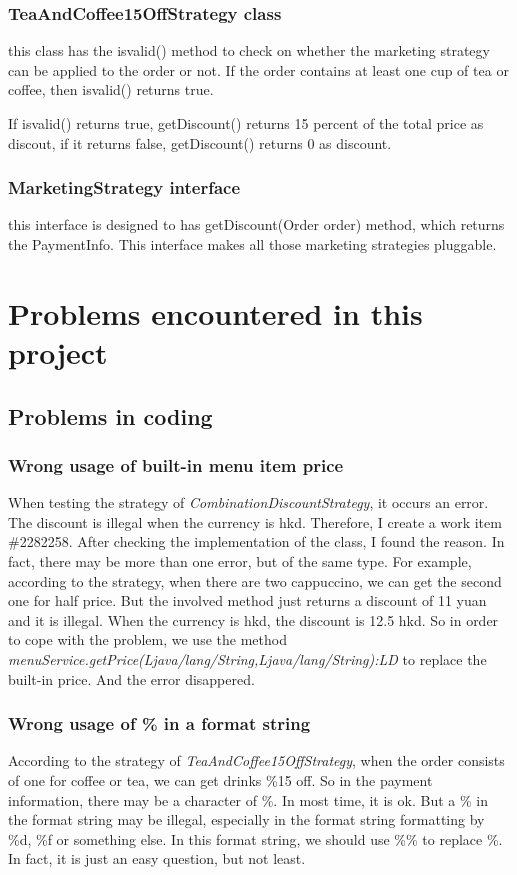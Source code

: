 \documentclass[a4paper]{report}
\begin{document}
\subsection{TeaAndCoffee15OffStrategy class}
\par this class has the isvalid() method to check on whether the marketing strategy can be applied to the order or not. If the order contains at least one cup of tea or coffee, then isvalid() returns true.
\par If isvalid() returns true, getDiscount() returns 15 percent of the total price as discout, if it returns false, getDiscount() returns 0 as discount.
\subsection{MarketingStrategy interface}
\par this interface is designed to has getDiscount(Order order) method, which returns the PaymentInfo. This interface makes all those marketing strategies pluggable.

\chapter{Problems encountered in this project}
\section{Problems in coding}
\subsection{Wrong usage of built-in menu item price}
\par When testing the strategy of \emph{CombinationDiscountStrategy}, it occurs an error. The discount is illegal when the currency is hkd. Therefore, I create a work item \#2282258. After checking the implementation of the class, I found the reason. In fact, there may be more than one error, but of the same type. For example, according to the strategy, when there are two cappuccino, we can get the second one for half price. But the involved method just returns a discount of 11 yuan and it is illegal. When the currency is hkd, the discount is 12.5 hkd. So in order to cope with the problem, we use the method \emph{menuService.getPrice(Ljava/lang/String,Ljava/lang/String):LD} to replace the built-in price. And the error disappered.
\subsection{Wrong usage of \% in a format string}
\par According to the strategy of \emph{TeaAndCoffee15OffStrategy}, when the order consists of one for coffee or tea, we can get drinks \%15 off. So in the payment information, there may be a character of \%. In most time, it is ok. But a \% in the format string may be illegal, especially in the format string formatting by \%d, \%f or something else. In this format string, we should use \%\% to replace \%. In fact, it is just an easy question, but not least.
\end{document}

